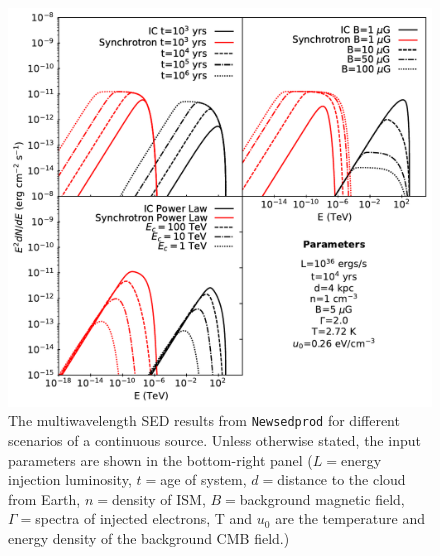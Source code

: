 \par~\par
\begin{figure}[hbtp]
    \centering
    \includegraphics[width=\textwidth]{07_Particle_Evolution/Images/Code/leptonic_changing_variabls.pdf}
    \caption{The multiwavelength SED results from {\tt Newsedprod} for different scenarios of a continuous source. Unless otherwise stated, the input parameters are shown in the bottom-right panel ($L=$energy injection luminosity, $t=$age of system, $d=$distance to the cloud from Earth, $n=$density of ISM, $B=$background magnetic field, $\Gamma=$spectra of injected electrons, T and $u_0$ are the temperature and energy density of the background CMB field.)}
    \label{fig:chapter_7_newsedprod_leptonic_changing}
\end{figure}
